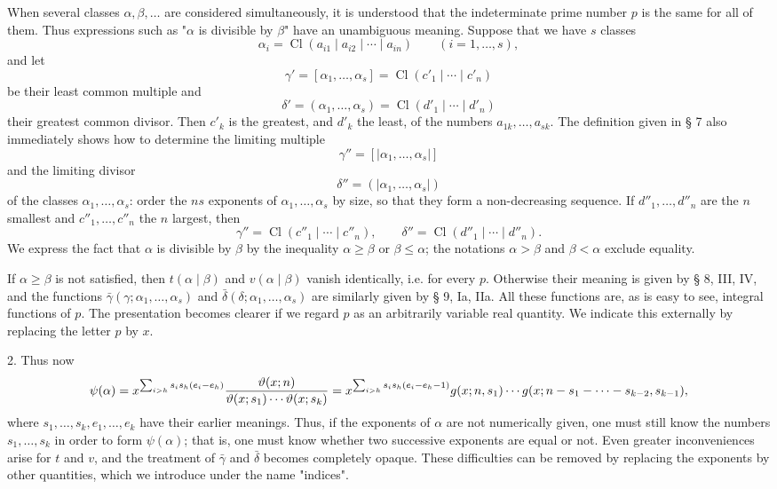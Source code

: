\documentclass[11pt,a4paper]{article}
\newcommand{\Cl}{\operatorname{Cl}}
\begin{document}
When several classes $\alpha,\beta,\ldots$ are considered simultaneously, it is understood that the indeterminate prime number $p$ is the same for all of them. Thus expressions such as "$\alpha$ is divisible by $\beta$" have an unambiguous meaning. Suppose that we have $s$ classes
\[
 \alpha_i=\Cl(a_{i1}\mid a_{i2}\mid\cdots\mid a_{in})\qquad (i=1,\ldots,s),
\]
and let
\[
 \gamma'=[\alpha_1,\ldots,\alpha_s]=\Cl(c'_1\mid\cdots\mid c'_n)
\]
be their least common multiple and
\[
 \delta'=(\alpha_1,\ldots,\alpha_s)=\Cl(d'_1\mid\cdots\mid d'_n)
\]
their greatest common divisor. Then $c'_k$ is the greatest, and $d'_k$ the least, of the numbers $a_{1k},\ldots,a_{sk}$. The definition given in § 7 also immediately shows how to determine the limiting multiple
\[
 \gamma''=[|\alpha_1,\ldots,\alpha_s|]
\]
and the limiting divisor
\[
 \delta''=(|\alpha_1,\ldots,\alpha_s|)
\]
of the classes $\alpha_1,
\ldots,\alpha_s$: order the $ns$ exponents of $\alpha_1,
\ldots,\alpha_s$ by size, so that they form a non-decreasing sequence. If $d''_1,
\ldots,d''_n$ are the $n$ smallest and $c''_1,
\ldots,c''_n$ the $n$ largest, then
\[
 \gamma''=\Cl(c''_1\mid\cdots\mid c''_n),\qquad
 \delta''=\Cl(d''_1\mid\cdots\mid d''_n).
\]
We express the fact that $\alpha$ is divisible by $\beta$ by the inequality $\alpha\ge\beta$ or $\beta\le\alpha$; the notations $\alpha>\beta$ and $\beta<\alpha$ exclude equality.

If $\alpha\ge\beta$ is not satisfied, then $t(\alpha\mid\beta)$ and $v(\alpha\mid\beta)$ vanish identically, i.e. for every $p$. Otherwise their meaning is given by § 8, III, IV, and the functions $\bar\gamma(\gamma;\alpha_1,\ldots,\alpha_s)$ and $\bar\delta(\delta;\alpha_1,\ldots,\alpha_s)$ are similarly given by § 9, Ia, IIa. All these functions are, as is easy to see, integral functions of $p$. The presentation becomes clearer if we regard $p$ as an arbitrarily variable real quantity. We indicate this externally by replacing the letter $p$ by $x$.

2. Thus now
\[
 \psi(\alpha)=x^{\sum_{i>h}s_i s_h(e_i-e_h)}
 {\vartheta(x;n)\over \vartheta(x;s_1)\cdots\vartheta(x;s_k)}
 =x^{\sum_{i>h}s_i s_h(e_i-e_h-1)}
 g(x;n,s_1)\cdots g(x;n-s_1-\cdots-s_{k-2},s_{k-1}),
\]
where $s_1,
\ldots,s_k,e_1,
\ldots,e_k$ have their earlier meanings. Thus, if the exponents of $\alpha$ are not numerically given, one must still know the numbers $s_1,
\ldots,s_k$ in order to form $\psi(\alpha)$; that is, one must know whether two successive exponents are equal or not. Even greater inconveniences arise for $t$ and $v$, and the treatment of $\bar\gamma$ and $\bar\delta$ becomes completely opaque. These difficulties can be removed by replacing the exponents by other quantities, which we introduce under the name "indices".
\end{document}
